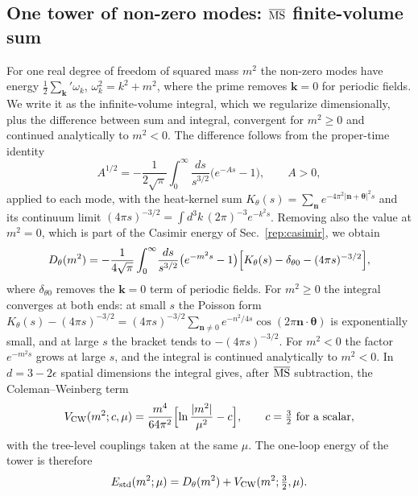 \subsection{One tower of non-zero modes: \texorpdfstring{$\overline{\mathrm{MS}}$}{MS-bar} finite-volume sum}
\label{sec:rb-tower}

For one real degree of freedom of squared mass $m^2$ the non-zero modes have energy $\frac12\sum_{\bm k}'\omega_k$, $\omega_k^2=k^2+m^2$, where the prime removes $\bm k=0$ for periodic fields.
We write it as the infinite-volume integral, which we regularize dimensionally, plus the difference between sum and integral, convergent for $m^2\geq0$ and continued analytically to $m^2<0$.
The difference follows from the proper-time identity
\begin{equation}
A^{1/2}=-\frac{1}{2\sqrt\pi}\int_0^\infty\frac{ds}{s^{3/2}}\bigl(e^{-As}-1\bigr),\qquad A>0,
\label{eq:rb-propertime}
\end{equation}
applied to each mode, with the heat-kernel sum $K_\theta(s)=\sum_{\bm n}e^{-4\pi^2|\bm n+\bm\theta|^2s}$ and its continuum limit $(4\pi s)^{-3/2}=\int d^3k\,(2\pi)^{-3}e^{-k^2s}$.
Removing also the value at $m^2=0$, which is part of the Casimir energy of Sec.~\ref{rep:casimir}, we obtain
\begin{equation}
D_\theta(m^2)=-\frac{1}{4\sqrt\pi}\int_0^\infty\!\frac{ds}{s^{3/2}}\bigl(e^{-m^2s}-1\bigr)\Bigl[K_\theta(s)-\delta_{\theta0}-(4\pi s)^{-3/2}\Bigr],
\label{eq:rb-Dtheta}
\end{equation}
where $\delta_{\theta0}$ removes the $\bm k=0$ term of periodic fields.
For $m^2\geq0$ the integral converges at both ends: at small $s$ the Poisson form $K_\theta(s)-(4\pi s)^{-3/2}=(4\pi s)^{-3/2}\sum_{\bm n\neq0}e^{-n^2/4s}\cos(2\pi\bm n\cdot\bm\theta)$ is exponentially small, and at large $s$ the bracket tends to $-(4\pi s)^{-3/2}$.
For $m^2<0$ the factor $e^{-m^2s}$ grows at large $s$, and the integral is continued analytically to $m^2<0$.
In $d=3-2\epsilon$ spatial dimensions the integral gives, after $\overline{\mathrm{MS}}$ subtraction, the Coleman--Weinberg term~\cite{Coleman:1973jx}
\begin{equation}
V_{\rm CW}(m^2;c,\mu)=\frac{m^4}{64\pi^2}\Bigl[\ln\frac{|m^2|}{\mu^2}-c\Bigr],\qquad c=\tfrac32\ \text{for a scalar},
\label{eq:rb-VCW}
\end{equation}
with the tree-level couplings taken at the same $\mu$.
The one-loop energy of the tower is therefore
\begin{equation}
E_{\rm std}(m^2;\mu)=D_\theta(m^2)+V_{\rm CW}(m^2;\tfrac32,\mu).
\label{eq:rb-Estd-def}
\end{equation}

